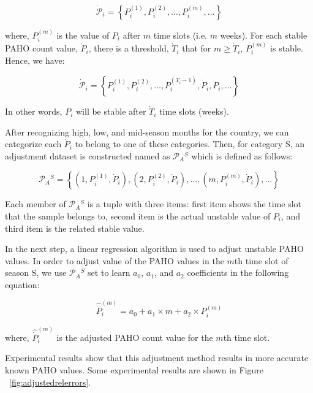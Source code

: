 \begin{equation}
\dot{\mathcal{P}}_i = \left \{P_i^{(1)},P_i^{(2)},...,P_i^{(m)},...  \right \}
\end{equation}

where, $P_i^{(m)}$ is the value of $P_i$ after $m$ time slots (i.e. $m$ weeks). For each stable PAHO count value, $\dot{P}_i$, there is a threshold, $\dot{T}_i$ that for $m \ge \dot{T}_i$, $P_i^{(m)}$ is stable. Hence, we have:

\begin{equation}
\dot{\mathcal{P}}_i = \left \{P_i^{(1)},P_i^{(2)},...,P_i^{(\dot{T}_i-1)},\dot{P}_i,\dot{P}_i,...  \right \}
\end{equation}

In other words, $P_i$ will be stable after $\dot{T}_i$ time slots (weeks). 

After recognizing high, low, and mid-season months for the country, we can categorize each $\dot{P}_i$ to belong to one of these categories. Then, for category S, an adjustment dataset is constructed named as $\mathcal{P}_A{^S}$ which is defined as follows:

\begin{equation}
\mathcal{P}_A{^S} = \left \{ (1,P_i^{(1)},\dot{P}_i),(2,P_i^{(2)},\dot{P}_i),...,(m,P_i^{(m)},\dot{P}_i), ...  \right \}
\end{equation}

Each member of $\mathcal{P}_A{^S}$ is a tuple with three items: first item shows the time slot that the sample belongs to, second item is the actual unstable value of $P_i$, and third item is the related stable value.

In the next step, a linear regression algorithm is used to adjust unstable PAHO values. In order to adjust value of the PAHO values in the $m$th time slot of season S, we use $\mathcal{P}_A{^S}$ set to learn $a_0$, $a_1$, and $a_2$ coefficients in the following equation:

\begin{equation}
\hat{\dot{P}}_i^{(m)} = a_0 + a_1 \times m + a_2 \times P_i^{(m)}
\end{equation}

where, $\hat{\dot{P}}_i^{(m)}$ is the adjusted PAHO count value for the $m$th time slot.

Experimental results show that this adjustment method results in more accurate known PAHO values. Some experimental results are shown in Figure ~\ref{fig:adjustedrelerrors}.

